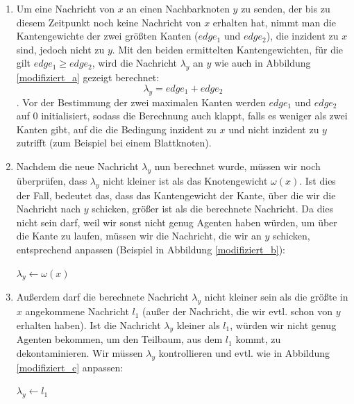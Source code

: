 \begin{enumerate}[label=\alph*)]
	
	\item 
		Um eine Nachricht von $x$ an einen Nachbarknoten $y$ zu senden, der bis zu diesem Zeitpunkt noch keine Nachricht von $x$ erhalten hat, nimmt man die Kantengewichte der zwei größten Kanten ($edge_{1}$ und $edge_{2}$), die inzident zu $x$ sind, jedoch nicht zu $y$. Mit den beiden ermittelten Kantengewichten, für die gilt $edge_{1} \ge edge_{2}$, wird die Nachricht $\lambda_{y}$ an $y$ wie auch in Abbildung \ref{modifiziert_a} gezeigt berechnet:
		$$\lambda_{y} = edge_{1} + edge_{2}$$.
		Vor der Bestimmung der zwei maximalen Kanten werden $edge_{1}$ und $edge_{2}$ auf 0 initialisiert, sodass die Berechnung auch klappt, falls es weniger als zwei Kanten gibt, auf die die Bedingung inzident zu $x$ und nicht inzident zu $y$ zutrifft (zum Beispiel bei einem Blattknoten).
	
	\item
		Nachdem die neue Nachricht $\lambda_{y}$ nun berechnet wurde, müssen wir noch überprüfen, dass $\lambda_{y}$ nicht kleiner ist als das Knotengewicht $\omega(x)$. Ist dies der Fall, bedeutet das, dass das Kantengewicht der Kante, über die wir die Nachricht nach $y$ schicken, größer ist als die berechnete Nachricht. Da dies nicht sein darf, weil wir sonst nicht genug Agenten haben würden, um über die Kante zu laufen, müssen wir die Nachricht, die wir an $y$ schicken, entsprechend anpassen (Beispiel in Abbildung \ref{modifiziert_b}):
		
		\begin{algorithmic}
			\State $\lambda_{y} \gets \omega(x)$
			\EndIf
		\end{algorithmic}
	
	\item
		Außerdem darf die berechnete Nachricht $\lambda_{y}$ nicht kleiner sein als die größte in $x$ angekommene Nachricht $l_{1}$ (außer der Nachricht, die wir evtl. schon von $y$ erhalten haben). Ist die Nachricht $\lambda_{y}$ kleiner als $l_{1}$, würden wir nicht genug Agenten bekommen, um den Teilbaum, aus dem $l_{1}$ kommt, zu dekontaminieren. Wir müssen $\lambda_{y}$ kontrollieren und evtl. wie in Abbildung \ref{modifiziert_c} anpassen:
		
		\begin{algorithmic}
			\If {$\lambda_{y} \leq l_{1}$}
			\State $\lambda_{y} \gets l_{1}$
			\EndIf
		\end{algorithmic}
	
\end{enumerate}

